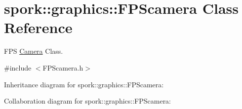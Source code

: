 \hypertarget{classspork_1_1graphics_1_1_f_p_scamera}{}\section{spork\+:\+:graphics\+:\+:F\+P\+Scamera Class Reference}
\label{classspork_1_1graphics_1_1_f_p_scamera}


F\+PS \hyperlink{classspork_1_1graphics_1_1_camera}{Camera} Class.  




{\ttfamily \#include $<$F\+P\+Scamera.\+h$>$}



Inheritance diagram for spork\+:\+:graphics\+:\+:F\+P\+Scamera\+:


Collaboration diagram for spork\+:\+:graphics\+:\+:F\+P\+Scamera\+:
